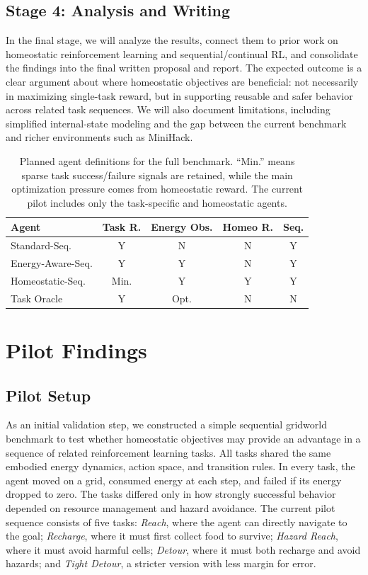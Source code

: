 \documentclass[sigplan,10pt]{acmart}
\begin{document}
\subsection{Stage 4: Analysis and Writing}
In the final stage, we will analyze the results, connect them to prior work on homeostatic reinforcement learning and sequential/continual RL, and consolidate the findings into the final written proposal and report. The expected outcome is a clear argument about where homeostatic objectives are beneficial: not necessarily in maximizing single-task reward, but in supporting reusable and safer behavior across related task sequences. We will also document limitations, including simplified internal-state modeling and the gap between the current benchmark and richer environments such as MiniHack.

\begin{table}[t]
\centering
\small
\begin{tabular}{lcccc}
\toprule
Agent & Task R. & Energy Obs. & Homeo R. & Seq. \\
\midrule
Standard-Seq.      & Y & N & N & Y \\
Energy-Aware-Seq.  & Y & Y & N & Y \\
Homeostatic-Seq.   & Min. & Y & Y & Y \\
Task Oracle        & Y & Opt. & N & N \\
\bottomrule
\end{tabular}
\caption{Planned agent definitions for the full benchmark. ``Min.'' means sparse task success/failure signals are retained, while the main optimization pressure comes from homeostatic reward. The current pilot includes only the task-specific and homeostatic agents.}
\label{tab:agent_types}
\end{table}

\section{Pilot Findings}

\subsection{Pilot Setup}
As an initial validation step, we constructed a simple sequential gridworld benchmark to test whether homeostatic objectives may provide an advantage in a sequence of related reinforcement learning tasks. All tasks shared the same embodied energy dynamics, action space, and transition rules. In every task, the agent moved on a grid, consumed energy at each step, and failed if its energy dropped to zero. The tasks differed only in how strongly successful behavior depended on resource management and hazard avoidance. The current pilot sequence consists of five tasks: \textit{Reach}, where the agent can directly navigate to the goal; \textit{Recharge}, where it must first collect food to survive; \textit{Hazard Reach}, where it must avoid harmful cells; \textit{Detour}, where it must both recharge and avoid hazards; and \textit{Tight Detour}, a stricter version with less margin for error.
\end{document}
